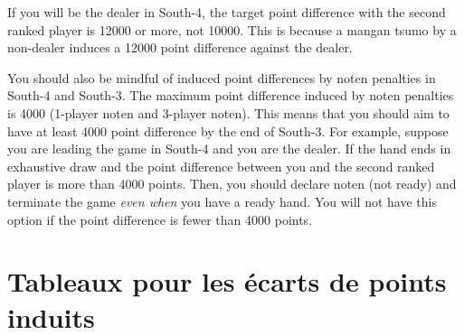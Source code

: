 \bigskip
If you will be the dealer in South-4, the target point difference with the second ranked player is 12000 or more, not 10000. This is because a {\jap mangan tsumo} by a non-dealer induces a 12000 point difference against the dealer. 

\bigskip
You should also be mindful of induced point differences by {\jap noten} penalties in South-4 and South-3. The maximum point difference induced by {\jap noten} penalties is 4000 (1-player {\jap noten} and 3-player {\jap noten}). This means that you should aim to have at least 4000 point difference by the end of South-3. 
For example, suppose you are leading the game in South-4 and you are the dealer. If the hand ends in exhaustive draw and the point difference between you and the second ranked player is more than 4000 points. Then, you should declare {\jap noten} (not ready) and terminate the game \emph{even when} you have a ready hand. You will not have this option if the point difference is fewer than 4000 points. 

\newpage

\section{Tableaux pour les écarts de points induits}

